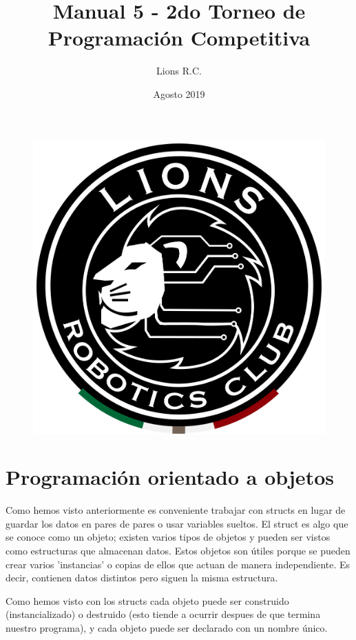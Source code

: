 \documentclass{article}
\title{Manual 5 - 2do Torneo de Programación Competitiva}
\author{Lions R.C.}
\date{Agosto 2019}
\begin{document}
\maketitle

\tableofcontents

\begin{figure}[H]
    \centering
    \includegraphics[width=0.2\paperwidth]{newblack}
\end{figure}

\section{Programación orientado a objetos}

Como hemos visto anteriormente es conveniente trabajar con structs en lugar de guardar los datos en pares de pares o usar variables sueltos. El struct es algo que se conoce como un objeto; existen varios tipos de objetos y pueden ser vistos como estructuras que almacenan datos. Estos objetos son útiles porque se pueden crear varios 'instancias' o copias de ellos que actuan de manera independiente. Es decir, contienen datos distintos pero siguen la misma estructura.

Como hemos visto con los structs cada objeto puede ser construido (instancializado) o destruido (esto tiende a ocurrir despues de que termina nuestro programa), y cada objeto puede ser declarado con un nombre único.
\end{document}
